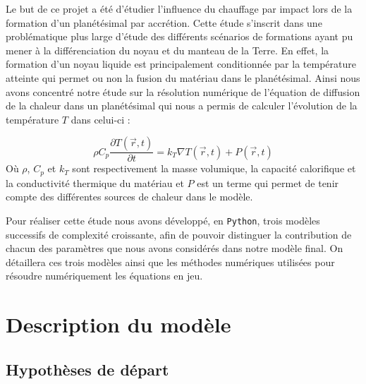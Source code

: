 \documentclass[10pt,a4paper]{article}
\numberwithin{equation}{section}
\begin{document}
Le but de ce  projet a été d'étudier l'influence du chauffage par impact lors de la formation d'un planétésimal par accrétion. Cette étude s'inscrit dans une problématique plus large d'étude des différents scénarios de formations ayant pu mener à la différenciation du noyau et du manteau de la Terre. En effet, la formation d'un noyau liquide est principalement conditionnée par la température atteinte qui permet ou non la fusion du matériau dans le planétésimal. Ainsi nous avons concentré notre étude sur la résolution numérique de l'équation de diffusion de la chaleur dans un planétésimal qui nous a permis de calculer l'évolution de la température $T$ dans celui-ci :

\begin{equation}
\rho C_p \frac{\partial T(\vec{r},t)}{\partial t} =  k_{T} \nabla T(\vec{r},t)  + P(\vec{r},t)
\end{equation}
Où $\rho$, $C_p$ et $k_{T}$ sont respectivement la masse volumique, la capacité calorifique et la conductivité thermique du matériau et $P$ est un terme qui permet de tenir compte des différentes sources de chaleur dans le modèle.



Pour réaliser cette étude nous avons développé, en \texttt{Python}, trois modèles successifs  de complexité croissante, afin de pouvoir distinguer la contribution de chacun des paramètres que nous avons considérés dans notre modèle final.
On détaillera ces trois modèles ainsi que les méthodes numériques utilisées pour résoudre numériquement les équations en jeu.


\section{Description du modèle}

\subsection{Hypothèses de départ}
\end{document}
